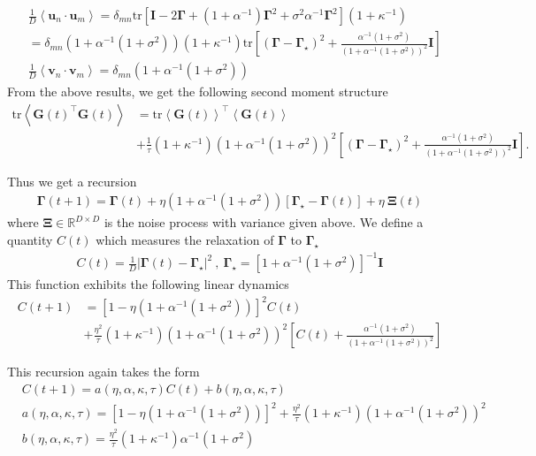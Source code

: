 \documentclass{article} %
\begin{document}
\begin{align}
    &\frac{1}{D} \left< \bm u_n \cdot \bm u_m \right> = \delta_{mn} \text{tr} \left[ \bm I - 2 \bm\Gamma + (1+\alpha^{-1}) \bm\Gamma^2 + \sigma^2 \alpha^{-1} \bm\Gamma^2  \right] (1 + \kappa^{-1})
    \\
    &=  \delta_{mn} (1 + \alpha^{-1}(1+\sigma^2)) (1+\kappa^{-1}) \text{tr} \left[ (\bm\Gamma - \bm\Gamma_\star)^2 +  \frac{\alpha^{-1}(1+\sigma^2)}{(1+\alpha^{-1}(1+\sigma^2))^2} \bm I  \right]
    \\
    &\frac{1}{D} \left< \bm v_n \cdot \bm v_m \right> = \delta_{mn}  (1+\alpha^{-1} (1+\sigma^2) ) 
\end{align}
From the above results, we get the following second moment structure
\begin{align}
    \text{tr} \left<  \bm G(t)^\top \bm G(t) \right> &=  \text{tr} \left<\bm G(t) \right>^\top \left<\bm G(t) \right> \nonumber
    \\
    &+ \frac{1}{\tau} (1+\kappa^{-1}) (1+\alpha^{-1}(1+\sigma^2))^2 \left[ (\bm\Gamma - \bm\Gamma_\star)^2 +  \frac{\alpha^{-1}(1+\sigma^2)}{(1+\alpha^{-1}(1+\sigma^2))^2} \bm I  \right] .
\end{align}

Thus we get a recursion
\begin{align}
    \bm\Gamma(t+1) = \bm\Gamma(t) + \eta (1+\alpha^{-1}(1+\sigma^2)) \left[ \bm\Gamma_\star - \bm\Gamma(t)  \right] + \eta \  \bm \Xi(t)
\end{align}
where $\bm\Xi \in \mathbb{R}^{D \times D}$ is the noise process with variance given above. We define a quantity $C(t)$ which measures the relaxation of $\bm\Gamma$ to $\bm\Gamma_\star$
\begin{align}
    C(t) = \frac{1}{D} \left|\bm\Gamma(t) -\bm\Gamma_\star \right|^2 \ , \ \bm\Gamma_\star = \left[  1 + \alpha^{-1} (1+\sigma^2)  \right]^{-1} \bm I
\end{align}
This function exhibits the following linear dynamics
\begin{align}
    C(t+1) &= \left[1 - \eta \left(1 +\alpha^{-1}(1+\sigma^2) \right) \right]^2 C(t) \nonumber
    \\
    &+ \frac{\eta^2}{\tau} (1+\kappa^{-1}) (1+\alpha^{-1}(1+\sigma^2))^2   \left[ C(t) + \frac{\alpha^{-1}(1+\sigma^2)}{(1+\alpha^{-1}(1+\sigma^2))^2} \right]
\end{align}

This recursion again takes the form
\begin{align}
    &C(t+1) = a(\eta,\alpha, \kappa,\tau) C(t) + b(\eta,\alpha, \kappa,\tau) \nonumber
    \\
    &a(\eta,\alpha, \kappa,\tau) = \left[1 - \eta \left(1 +\alpha^{-1}(1+\sigma^2) \right) \right]^2  + \frac{\eta^2}{\tau} (1+\kappa^{-1}) (1+\alpha^{-1}(1+\sigma^2))^2 \nonumber
    \\
    &b(\eta,\alpha,\kappa,\tau) = \frac{\eta^2}{\tau} (1+\kappa^{-1}) \alpha^{-1}(1+\sigma^2)
\end{align}
\end{document}
